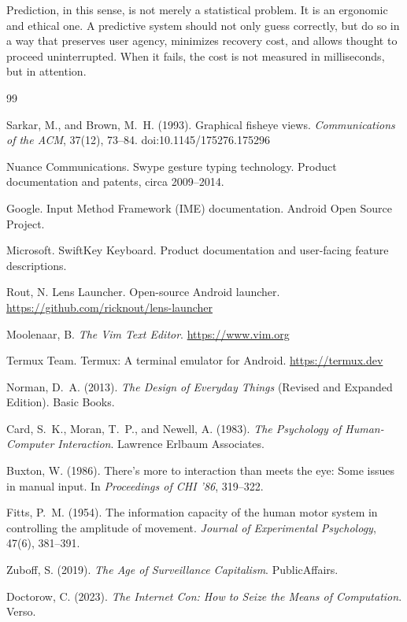 \documentclass[11pt]{article}
\begin{document}
Prediction, in this sense, is not merely a statistical problem. It is an ergonomic and ethical one. A predictive system should not only guess correctly, but do so in a way that preserves user agency, minimizes recovery cost, and allows thought to proceed uninterrupted. When it fails, the cost is not measured in milliseconds, but in attention.
\newpage
\begin{thebibliography}{99}

Sarkar, M., and Brown, M.~H. (1993).
\newblock Graphical fisheye views.
\newblock \emph{Communications of the ACM}, 37(12), 73--84.
\newblock doi:10.1145/175276.175296

Nuance Communications.
\newblock Swype gesture typing technology.
\newblock Product documentation and patents, circa 2009--2014.

Google.
\newblock Input Method Framework (IME) documentation.
\newblock Android Open Source Project.

Microsoft.
\newblock SwiftKey Keyboard.
\newblock Product documentation and user-facing feature descriptions.

Rout, N.
\newblock Lens Launcher.
\newblock Open-source Android launcher.
\newblock \url{https://github.com/ricknout/lens-launcher}

Moolenaar, B.
\newblock \emph{The Vim Text Editor}.
\newblock \url{https://www.vim.org}

Termux Team.
\newblock Termux: A terminal emulator for Android.
\newblock \url{https://termux.dev}

Norman, D.~A. (2013).
\newblock \emph{The Design of Everyday Things} (Revised and Expanded Edition).
\newblock Basic Books.

Card, S.~K., Moran, T.~P., and Newell, A. (1983).
\newblock \emph{The Psychology of Human-Computer Interaction}.
\newblock Lawrence Erlbaum Associates.

Buxton, W. (1986).
\newblock There’s more to interaction than meets the eye: Some issues in manual input.
\newblock In \emph{Proceedings of CHI ’86}, 319--322.

Fitts, P.~M. (1954).
\newblock The information capacity of the human motor system in controlling the amplitude of movement.
\newblock \emph{Journal of Experimental Psychology}, 47(6), 381--391.

Zuboff, S. (2019).
\newblock \emph{The Age of Surveillance Capitalism}.
\newblock PublicAffairs.

Doctorow, C. (2023).
\newblock \emph{The Internet Con: How to Seize the Means of Computation}.
\newblock Verso.

\end{thebibliography}
\end{document}
